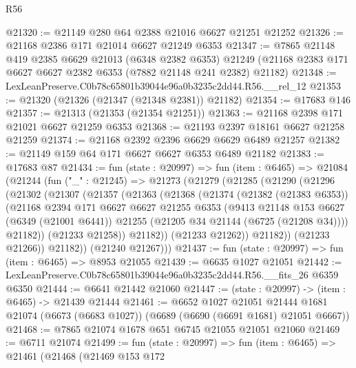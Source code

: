\begin{lexlean}{R56}
\begin{coremodule}
@21320 := @21149 @280 @64 @2388 @21016 @6627 @21251 @21252
@21326 := @21168 @2386 @171 @21014 @6627 @21249 @6353
@21347 := @7865
    @21148
    @419
    @2385
    @6629
    @21013
    (@6348 @2382 @6353)
    @21249
    (@21168 @2383 @171 @6627 @6627 @2382 @6353 (@7882 @21148 @241 @2382) @21182)
@21348 := LexLeanPreserve.C0b78c65801b39044e96a0b3235c2dd44.R56.__rel_12
@21353 := @21320 (@21326 (@21347 (@21348 @2381)) @21182)
@21354 := @17683 @146
@21357 := @21313 (@21353 (@21354 @21251))
@21363 := @21168 @2398 @171 @21021 @6627 @21259 @6353
@21368 := @21193 @2397 @18161 @6627 @21258 @21259
@21374 := @21168 @2392 @2396 @6629 @6629 @6489 @21257
@21382 := @21149 @159 @64 @171 @6627 @6627 @6353 @6489 @21182
@21383 := @17683 @87
@21434 := fun (state : @20997) =>
  fun (item : @6465) =>
  @21084
    (@21244
      (fun ("_" : @21245) =>
      @21273
        (@21279
          (@21285
            (@21290
              (@21296
                (@21302
                  (@21307
                    (@21357
                      (@21363
                        (@21368
                          (@21374
                            (@21382 (@21383 @6353))
                            (@21168
                              @2394
                              @171
                              @6627
                              @6627
                              @21255
                              @6353
                              (@9413
                                @21148
                                @153
                                @6627
                                (@6349 (@21001 @6441))
                                @21255
                                (@21205 @34 @21144 (@6725 (@21208 @34))))
                              @21182))
                          (@21233 @21258))
                        @21182))
                    (@21233 @21262))
                  @21182))
              (@21233 @21266))
            @21182))
        (@21240 @21267)))
@21437 := fun (state : @20997) => fun (item : @6465) => @8953 @21055
@21439 := @6635 @1027 @21051
@21442 := LexLeanPreserve.C0b78c65801b39044e96a0b3235c2dd44.R56.__fits_26 @6359 @6350
@21444 := @6641 @21442 @21060
@21447 := (state : @20997) -> (item : @6465) -> @21439 @21444
@21461 := @6652
    @1027
    @21051
    @21444
    @1681
    @21074
    (@6673 (@6683 @1027))
    (@6689 (@6690 (@6691 @1681) @21051 @6667))
@21468 := @7865 @21074 @1678 @651 @6745 @21055 @21051 @21060
@21469 := @6711 @21074
@21499 := fun (state : @20997) =>
  fun (item : @6465) =>
  @21461
    (@21468
      (@21469
        @153
        @172

\end{coremodule}
\end{lexlean}
